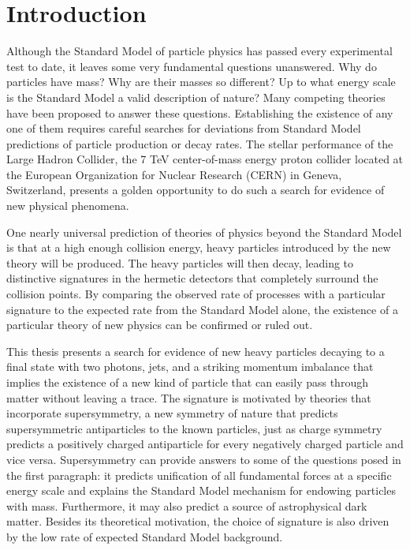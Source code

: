 \documentclass[dissertation.tex]{subfiles}
\begin{document}
\chapter{Introduction}
\label{chap:Introduction}

\thispagestyle{myheadings}
\markright{\hfill}

Although the Standard Model of particle physics has passed every experimental test to date, it leaves some very fundamental questions unanswered.  Why do particles have mass?  Why are their masses so different?  Up to what energy scale is the Standard Model a valid description of nature?  Many competing theories have been proposed to answer these questions.  Establishing the existence of any one of them requires careful searches for deviations from Standard Model predictions of particle production or decay rates.  The stellar performance of the Large Hadron Collider, the 7 TeV center-of-mass energy proton collider located at the European Organization for Nuclear Research (CERN) in Geneva, Switzerland, presents a golden opportunity to do such a search for evidence of new physical phenomena.

One nearly universal prediction of theories of physics beyond the Standard Model is that at a high enough collision energy, heavy particles introduced by the new theory will be produced.  The heavy particles will then decay, leading to distinctive signatures in the hermetic detectors that completely surround the collision points.  By comparing the observed rate of processes with a particular signature to the expected rate from the Standard Model alone, the existence of a particular theory of new physics can be confirmed or ruled out.

This thesis presents a search for evidence of new heavy particles decaying to a final state with two photons, jets, and a striking momentum imbalance that implies the existence of a new kind of particle that can easily pass through matter without leaving a trace.  The signature is motivated by theories that incorporate supersymmetry, a new symmetry of nature that predicts supersymmetric antiparticles to the known particles, just as charge symmetry predicts a positively charged antiparticle for every negatively charged particle and vice versa.  Supersymmetry can provide answers to some of the questions posed in the first paragraph: it predicts unification of all fundamental forces at a specific energy scale and explains the Standard Model mechanism for endowing particles with mass.  Furthermore, it may also predict a source of astrophysical dark matter.  Besides its theoretical motivation, the choice of signature is also driven by the low rate of expected Standard Model background.
\end{document}

